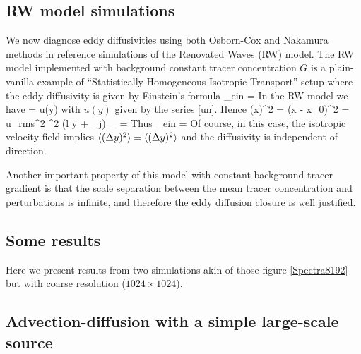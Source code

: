 \documentclass[11pt]{article}
\begin{document}
\subsection{RW model simulations}
We now diagnose eddy diffusivities using both Osborn-Cox and Nakamura methods in reference simulations of the Renovated Waves (RW) model.  The RW model implemented with background constant tracer concentration $G$ is a plain-vanilla example of ``Statistically Homogeneous Isotropic Transport'' setup where the eddy diffusivity is given by Einstein's formula
\beq
\label{einstein_eddy_diffusivity}
\kappa_{ein} = \per
\eeq 
In the RW model we have
\beq
\label{dxdt}
 = u(y)\com
\eeq
with $u(y)$ given by the series \eqref{un}. Hence
\beq
\label{dx2}
\la (\Delta x)^2 \ra = \la (x - x_0)^2 \ra = u_{rms}^2 \tau^2 \la \cos (l y + \psi_j) \ra_{\psi} = \per 
\eeq
Thus
\beq
\label{einstein_eddy_diffusivity}
\kappa_{ein} = \per
\eeq 
Of course, in this case, the isotropic velocity field implies $\langle (\Delta y)^2\rangle = \langle (\Delta y)^2\rangle$ and the diffusivity is independent of direction.

Another important property of this model with constant background tracer gradient is that the scale separation between the mean tracer concentration and perturbations is infinite, and therefore the eddy diffusion closure is well justified.

\subsection{Some results}

Here we present results from two simulations akin of those figure \ref{Spectra8192} but with coarse resolution ($1024\times1024$).




\subsection{Advection-diffusion with a simple large-scale source}
\end{document}
